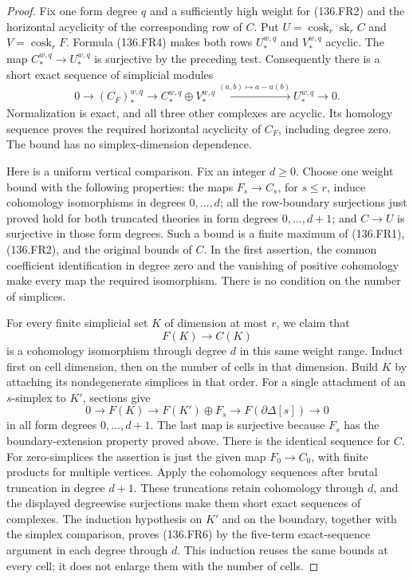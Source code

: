 \begin{proof}
Fix one form degree \(q\) and a sufficiently high weight for
(136.FR2) and the horizontal acyclicity of the corresponding
row of \(C\). Put
\(U=\operatorname{cosk}_r\operatorname{sk}_r C\) and
\(V=\operatorname{cosk}_r F\). Formula (136.FR4) makes
both rows \(U_*^{w,q}\) and \(V_*^{w,q}\) acyclic.
The map \(C_*^{w,q}\to U_*^{w,q}\) is surjective by
the preceding test. Consequently there is a short exact sequence
of simplicial modules
\[
 0\longrightarrow (C_F)_*^{w,q}
   \longrightarrow C_*^{w,q}\oplus V_*^{w,q}
   \xrightarrow{(a,b)\mapsto a-u(b)}U_*^{w,q}
   \longrightarrow0.                                  \tag{136.FR5}
\]
Normalization is exact, and all three other complexes are
acyclic. Its homology sequence proves the required horizontal
acyclicity of \(C_F\), including degree zero. The bound
has no simplex-dimension dependence.

Here is a uniform vertical comparison. Fix an integer
\(d\geq0\). Choose one weight bound with the following
properties: the maps \(F_s\to C_s\), for \(s\leq r\),
induce cohomology isomorphisms in degrees \(0,\ldots,d\);
all the row-boundary surjections just proved hold for both
truncated theories in form degrees \(0,\ldots,d+1\);
and \(C\to U\) is surjective in those form degrees.
Such a bound is a finite maximum of (136.FR1), (136.FR2),
and the original bounds of \(C\). In the first assertion,
the common coefficient identification in degree zero and the
vanishing of positive cohomology make every map the required
isomorphism. There is no condition on the number of simplices.

For every finite simplicial set \(K\) of dimension at most
\(r\), we claim that
\[
                         F(K)\longrightarrow C(K)
                                                        \tag{136.FR6}
\]
is a cohomology isomorphism through degree \(d\) in this
same weight range. Induct first on cell dimension, then on the number of cells in
that dimension. Build \(K\) by attaching its nondegenerate
simplices in that order. For a single attachment of
an \(s\)-simplex to \(K'\), sections give
\[
 0\longrightarrow F(K)
  \longrightarrow F(K')\oplus F_s
  \longrightarrow F(\partial\Delta[s])
  \longrightarrow0                                    \tag{136.FR7}
\]
in all form degrees \(0,\ldots,d+1\). The last map is
surjective because \(F_s\) has the boundary-extension
property proved above. There is the identical sequence for
\(C\). For zero-simplices the assertion is just the given
map \(F_0\to C_0\), with finite products for multiple
vertices. Apply the cohomology sequences after brutal truncation
in degree \(d+1\). These truncations retain cohomology through
\(d\), and the displayed degreewise surjections make them
short exact sequences of complexes. The induction hypothesis on
\(K'\) and on the boundary, together with the simplex comparison,
proves (136.FR6) by the five-term exact-sequence argument in each
degree through \(d\). This induction reuses the same bounds
at every cell; it does not enlarge them with the number of cells.


\end{proof}
